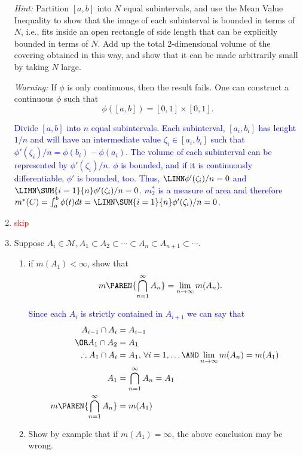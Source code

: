 \documentclass[10pt,a4paper]{report}
\newcommand{\RED}[1]{\textcolor{red}{#1}}
\newcommand{\BLUE}[1]{\textcolor{blue}{#1}}
\begin{document}
\begin{enumerate}[label=\Roman*.]
\textit{Hint: } Partition $[a,b]$ into $N$ equal subintervals, and use the Mean Value Inequality to show that the image of each subinterval is bounded in terms of $N$, i.e., fits inside an open rectangle of side length that can be explicitly bounded in terms of $N$.  Add up the total 2-dimensional volume of the covering obtained in this way, and show that it can be made arbitrarily small by taking $N$ large.

\textit{Warning:}  If $\phi$ is only continuous, then the result fails. One can construct a continuous $\phi$ such that $$ \phi([a,b])=[0,1]\times[0,1].$$

\BLUE{Divide $[a,b]$ into $n$ equal subintervals.  Each subinterval, $[a_i,b_i]$ has lenght $1/n$ and will have an intermediate value $\zeta_i \in [a_i,b_i]$ such that $\phi'(\zeta_i)/n = \phi(b_i)-\phi(a_i)$.  The volume of each subinterval can be represented by $\phi'(\zeta_i)/n$.  $\phi$ is bounded, and if it is continuously differentiable, $\phi'$ is bounded, too.  Thus, $\LIMN \phi'(\zeta_i)/n=0$ and  $\LIMN \SUM{i=1}{n}\phi'(\zeta_i)/n = 0$.  $m_2^*$ is a measure of area and therefore $m^*(C)= \int_a^b \phi(t) dt = \LIMN \SUM{i=1}{n}\phi'(\zeta_i)/n =0$.
}

\newpage
\item \RED{skip}
\item Suppose $A_i \in \mathcal{M}, A_1 \subset A_2 \subset \cdots \subset A_n \subset A_{n+1} \subset \cdots$.
\begin{enumerate}[label=(\alph*)]
	\item if $m(A_1) < \infty$, show that 
	\begin{align*}
		m\PAREN{\bigcap_{n=1}^\infty A_n} &= \lim_{n\to\infty} m(A_n).
	\end{align*}
	
	\BLUE{Since each $A_i$ is strictly contained in $A_{i+1}$ we can say that
	\begin{align*}
		A_{i-1} \cap A_i &= A_{i-1} \\
		\OR A_1 \cap A_2 &= A_1 \\
		\therefore A_1 \cap A_i &= A_1, \, \forall i=1,\dots\AND\lim_{n\to \infty} m(A_n) = m(A_1) \\
		A_1 &= \bigcap_{n=1}^\infty A_n = A_1\\
		m\PAREN{\bigcap_{n=1}^\infty A_n} &= m(A_1)
	\end{align*}
	}
	
	\item Show by example that if $m(A_1)=\infty$, the above conclusion may be wrong.
	

\end{enumerate}
\end{enumerate}
\end{document}
